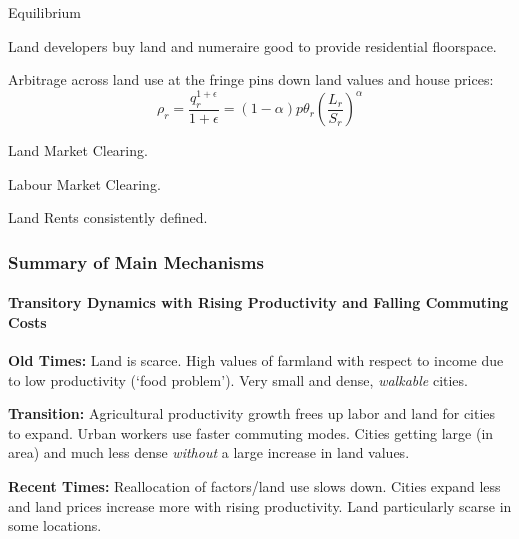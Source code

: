 \documentclass[aspectratio=169]{beamer}
\begin{document}









\begin{frame}[label=eqm]{Equilibrium}

	\begin{midi}
		\item Land developers buy land and numeraire good to provide residential floorspace. \hyperlink{landdevelopers}{}
		\item Arbitrage across land use at the fringe pins down land values and house prices:
		\begin{equation*}
			\rho_r = \frac{q_r^{1+\epsilon}}{1+\epsilon} = (1-\alpha)p \theta_r \left(\frac{L_r}{S_r}\right)^\alpha
		\end{equation*}
		\item Land Market Clearing.
		\item Labour Market Clearing.
		\item Land Rents consistently defined.
	\end{midi}

\end{frame}

\begin{frame}
	\frametitle{Summary of Main Mechanisms}
	\framesubtitle{Transitory Dynamics with Rising Productivity and Falling Commuting Costs}
	
	\begin{widei}
	\item<1-> \textbf{Old Times:} Land is scarce. High values of farmland with respect to income due to low productivity (`food problem'). Very small and dense, \emph{walkable} cities.
	\item<2-> \textbf{Transition:} Agricultural productivity growth frees up labor and land for cities to expand. Urban workers use faster commuting modes. Cities getting large (in area) and much less dense \emph{without} a large increase in land values.
	\item<3-> \textbf{Recent Times:} Reallocation of factors/land use slows down. Cities expand less and land prices increase more with rising productivity. Land particularly scarse in some locations.
	\end{widei}
	\end{frame}
\end{document}
